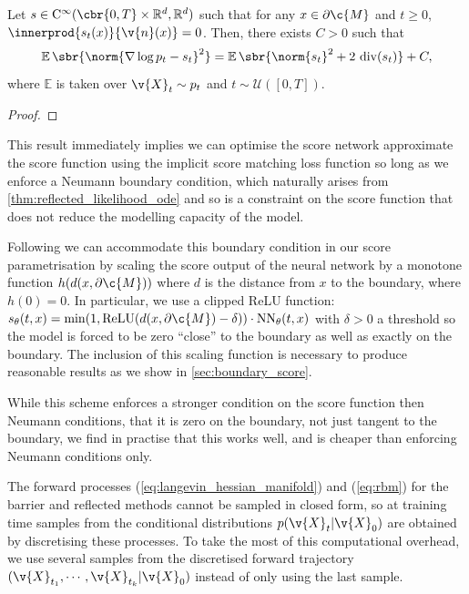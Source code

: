 \begin{proposition}
	Let \(s \in \mathrm{C}^\infty(\cbr{0,T} \times \R^d, \R^d)\) such that for any \(x \in \partial \c{M}\) and \(t \geq 0\), \(\innerprod{s_t(x)}{\v{n}(x)} = 0\).
	Then, there exists \(C >0\) such that \begin{equation} {\E\sbr{\norm{\nabla \log p_t - s_t}^2} = \E\sbr{\norm{s_t}^2 + 2~ \mathrm{div}(s_t)}} + C , \end{equation} where \(\mathbb{E}\) is taken over \(\v{X}_t \sim p_t\) and \(t \sim \mathcal{U}([0,T])\).
\end{proposition}
\begin{proof}
\end{proof}

This result immediately implies we can optimise the score network approximate the score function using the implicit score matching loss function so long as we enforce a Neumann boundary condition, which naturally arises from \cref{thm:reflected_likelihood_ode} and so is a constraint on the score function that does not reduce the modelling capacity of the model.

Following \textcite{liu2022estimating} we can accommodate this boundary condition in our score parametrisation by scaling the score output of the neural network by a monotone function \(h(d(x, \partial \c{M}))\) where \(d\) is the distance from \(x\) to the boundary, where \(h(0) = 0\).
In particular, we use a clipped ReLU function: \(s_\theta(t, x) = \min(1, \textrm{ReLU}(d(x, \partial \c{M}) - \delta)) \cdot \textrm{NN}_\theta(t, x)\) with \(\delta>0\) a threshold so the model is forced to be zero ``close'' to the boundary as well as exactly on the boundary. %
The inclusion of this scaling function is necessary to produce reasonable results as we show in \cref{sec:boundary_score}.

While this scheme enforces a stronger condition on the score function then Neumann conditions, that it is zero on the boundary, not just tangent to the boundary, we find in practise that this works well, and is cheaper than enforcing Neumann conditions only.

The forward processes (\cref{eq:langevin_hessian_manifold}) and (\cref{eq:rbm}) for the barrier and reflected methods cannot be sampled in closed form, so at training time samples from the conditional distributions \(p(\v{X}_t|\v{X}_0)\) are obtained by discretising these processes.
To take the most of this computational overhead, we use several samples from the discretised forward trajectory \((\v{X}_{t_1}, \cdots, \v{X}_{t_k}|\v{X}_0)\) instead of only using the last sample.

